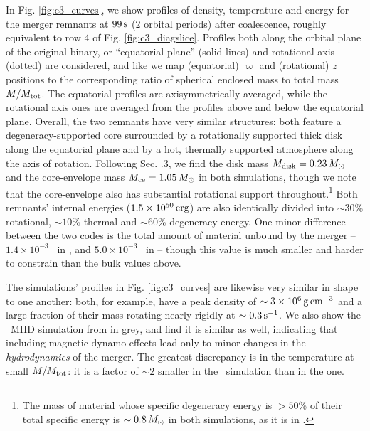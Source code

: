 In Fig. \ref{fig:c3_curves}, we show profiles of density, temperature and energy for the merger remnants at $99\,\mathrm{s}$ ($2$ orbital periods) after coalescence, roughly equivalent to row 4 of Fig. \ref{fig:c3_diagslice}.  Profiles both along the orbital plane of the original binary, or ``equatorial plane'' (solid lines) and rotational axis (dotted) are considered, and like \citeal{zhu+13} we map (equatorial) $\varpi$ and (rotational) $z$ positions to the corresponding ratio of spherical enclosed mass to total mass $M/M_{\rm tot}$.  The equatorial profiles are axisymmetrically averaged, while the rotational axis ones are averaged from the profiles above and below the equatorial plane.  Overall, the two remnants have very similar structures: both feature a degeneracy-supported core surrounded by a rotationally supported thick disk along the equatorial plane and by a hot, thermally supported atmosphere along the axis of rotation.  Following \citeal{zhu+13} Sec. {.3}, we find the disk mass $\Mdisk = 0.23\,\Msun$ and the core-envelope mass $\Mrem = 1.05\,\Msun$ in both simulations, though we note that the core-envelope also has substantial rotational support throughout.\footnote{The mass of material whose specific degeneracy energy is $>50$\% of their total specific energy is $\sim0.8\,\Msun$ in both simulations, as it is in \cite{zhu+15}.}  Both remnants' internal energies ($1.5\times10^{50}\,\mathrm{erg}$) are also identically divided into $\sim30$\% rotational, $\sim10$\% thermal and $\sim60$\% degeneracy energy.  One minor difference between the two codes is the total amount of material unbound by the merger -- $1.4\times10^{-3}$ \Msun\ in \gasoline, and $5.0\times10^{-3}$ \Msun\ in \arepo -- though this value is much smaller and harder to constrain than the bulk values above.



The simulations' profiles in Fig. \ref{fig:c3_curves} are likewise very similar in shape to one another: both, for example, have a peak density of $\sim3\times10^6\,\gcc$ and a large fraction of their mass rotating nearly rigidly at $\sim0.3\,\psec$.  We also show the \arepo\ MHD simulation from \cite{zhu+15} in grey, and find it is similar as well, indicating that including magnetic dynamo effects lead only to minor changes in the \textit{hydrodynamics} of the merger.  The greatest discrepancy is in the temperature at small $M/M_{\rm tot}$: it is a factor of $\sim2$ smaller in the \arepo\ simulation than in the \gasoline one.

